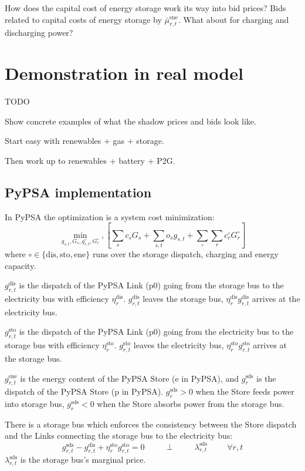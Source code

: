 \documentclass[final,3p,times]{elsarticle}
\begin{document}
How does the capital cost of energy storage work its way into bid prices? Bids related to capital costs of energy storage by $\bar{\mu}^{\textrm{ene}}_{r,t}$. What about for charging and discharging power?


\section{Demonstration in real model}

TODO

Show concrete examples of what the shadow prices and bids look like.

Start easy with renewables + gas + storage.

Then work up to renewables + battery + P2G.


\subsection{PyPSA implementation}

In PyPSA the optimization is a system cost minimization:
\begin{equation}
    \min_{g_{s,t}, G_s,g^{\circ}_{r,t},G^{\circ}_{r}},\left[ \sum_s c_s G_s + \sum_{s,t} o_{s} g_{s,t} +\sum_{\circ}\sum_r c^{\circ}_r G^{\circ}_r\right]  \label{eq:objpypsa}
\end{equation}
where $\circ\in \{\textrm{dis},\textrm{sto},\textrm{ene}\}$ runs over
the storage dispatch, charging and energy capacity.

$g^{\textrm{dis}}_{r,t}$ is the dispatch of the PyPSA Link (p0) going from the storage bus to the electricity bus with efficiency $\eta^{\textrm{dis}}_r$. $g^{\textrm{dis}}_{r,t}$ leaves the storage bus, $\eta^{\textrm{dis}}_rg^{\textrm{dis}}_{r,t}$ arrives at the electricity bus.

$g^{\textrm{sto}}_{r,t}$ is the dispatch of the PyPSA Link (p0) going from the electricity bus to the storage bus with efficiency $\eta^{\textrm{sto}}_r$.  $g^{\textrm{sto}}_{r,t}$ leaves the electricity bus, $\eta^{\textrm{sto}}_rg^{\textrm{sto}}_{r,t}$ arrives at the storage bus.

$g^{\textrm{ene}}_{r,t}$ is the energy content of the PyPSA Store (e in PyPSA), and $g^{\textrm{sds}}_r$ is the dispatch of the PyPSA Store (p in PyPSA). $g^{\textrm{sds}}_r > 0$ when the Store feeds power into storage bus, $g^{\textrm{sds}}_r < 0$ when the Store absorbs power from the storage bus.

There is a storage bus which enforces the consistency between the
Store dispatch and the Links connecting the storage bus to the electricity bus:
\begin{equation}
  g^{\textrm{sds}}_{r,t} - g^{\textrm{dis}}_{r,t} + \eta^{\textrm{sto}}_r g^{\textrm{sto}}_{r,t} = 0  \hspace{1cm}\perp \hspace{1cm} \lambda^{\textrm{sds}}_{r,t} \hspace{1cm} \forall r,t \label{eq:biddingconstraint}
\end{equation}
$\lambda^{\textrm{sds}}_{r,t}$ is the storage bus's marginal price.
\end{document}
